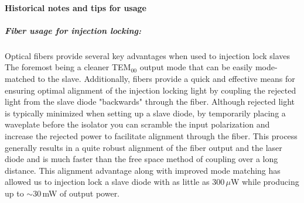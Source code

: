 \paragraph{Historical notes and tips for usage}
\subparagraph{Fiber usage for injection locking:}
Optical fibers provide several key advantages when used to injection lock slaves
The foremost being a cleaner TEM$_{00}$ output mode that can be easily mode-matched to the slave. 
Additionally, fibers provide a quick and effective means for ensuring optimal alignment of the injection locking light by coupling the rejected light from the slave diode "backwards" through the fiber. 
Although rejected light is typically minimized when setting up a slave diode, by temporarily placing a waveplate before the isolator you can scramble the input polarization and increase the rejected power to facilitate alignment through the fiber. 
This process generally results in a quite robust alignment of the fiber output and the laser diode and is much faster than the free space method of coupling over a long distance. 
This alignment advantage along with improved mode matching has allowed us to injection lock a slave diode with as little as 300\,$\mu$W while producing up to $\sim$30\,mW of output power.

%
%
%
%
%

